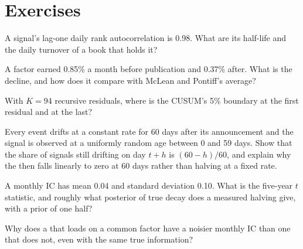 \section{Exercises}

\begin{exercise}[$\star$]\label{exo:rs:half-life-decay-and-stability:1}
A signal's lag-one daily rank autocorrelation is 0.98. What are its half-life and the daily turnover of a book that holds it?
\end{exercise}

\begin{exercise}[$\star$]\label{exo:rs:half-life-decay-and-stability:2}
A factor earned 0.85\% a month before publication and 0.37\% after. What is the decline, and how does it compare with McLean and Pontiff's
average?
\end{exercise}

\begin{exercise}[$\star$]\label{exo:rs:half-life-decay-and-stability:3}
With $K = 94$ recursive residuals, where is the CUSUM's 5\% boundary at the first residual and at the last?
\end{exercise}

\begin{exercise}[$\star\star$]\label{exo:rs:half-life-decay-and-stability:4}
Every event drifts at a constant rate for 60 days after its announcement and the signal is observed at a uniformly random age
between 0 and 59 days. Show that the share of signals still drifting on day $t + h$ is $(60 - h)/60$, and explain why the  then
falls linearly to zero at 60 days rather than halving at a fixed rate.
\end{exercise}

\begin{exercise}[$\star\star$]\label{exo:rs:half-life-decay-and-stability:5}
A monthly IC has mean 0.04 and standard deviation 0.10. What is the five-year $t$ statistic, and roughly what posterior of true decay does a
measured halving give, with a prior of one half?
\end{exercise}

\begin{exercise}[$\star\star$]\label{exo:rs:half-life-decay-and-stability:6}
Why does a  that loads on a common factor have a noisier monthly IC than one that does not, even with the same true information?
\end{exercise}

